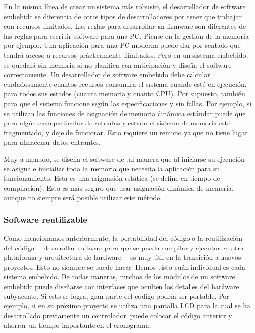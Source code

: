 \documentclass[output=paper, 
colorlinks,
citecolor=brown,
newtxmath
]{langscibook}
\begin{document}
En la misma línea de crear un sistema más robusto, el desarrollador
de software embebido se diferencia de otros tipos de desarrolladores
por tener que trabajar con recursos limitados.
Las reglas para desarrollar un firmware son diferentes de las reglas para 
escribir software para una PC. Piense en la gestión de la memoria por ejemplo.
Una aplicación para una PC moderna puede dar por sentado que tendrá acceso a recursos prácticamente ilimitados. Pero en un sistema embebido, se quedará sin memoria si no planifica con anticipación y diseña el software correctamente.
Un desarrollador de software embebido debe calcular cuidadosamente cuantos
recursos consumirá el sistema cuando esté en ejecución, para todos sus estados
(cuanta memoria y cuanto CPU).
Por supuesto, también para que el sistema funcione según 
las especificaciones y sin fallas. Por ejemplo, 
si se utilizan las funciones de asignación de memoria dinámica 
estándar puede que para algún caso particular de entradas
y estado el sistema de memoria esté fragmentado, y deje de funcionar.
Esto requiere un reinicio ya que no tiene lugar para almacenar datos entrantes.

Muy a menudo, se diseña el software de tal manera que al iniciarse
su ejecución se asigna e inicialize toda la memoria que necesita la aplicación
para su funcionamiento. Esta es una asignación estática (se define
en tiempo de compilación).
Esto es más seguro que usar asignación dinámica de memoria, 
aunque no siempre será posible utilizar este método.




\subsubsection *{Software reutilizable}

Como mencionamos anteriormente, la portabilidad del código o la 
reutilización del código —desarrollar software para que se pueda compilar
y ejecutar en otra plataforma y arquitectura de hardware— es muy 
útil en la transición a nuevos proyectos. Esto no siempre se puede hacer.
Hemos visto cuán individual es cada sistema embebido. 
De todas maneras, muchos de los módulos de un software embebido
puede diseñarse con interfaces que oculten los detalles del hardware
subyacente. Si esto se logra, gran parte del código podría ser portable.
Por ejemplo, si en su próximo proyecto se utiliza una pantalla LCD 
para la cual se ha desarrollado previamente un controlador, 
puede colocar el código anterior y ahorrar un tiempo importante en el cronograma.
\end{document}
